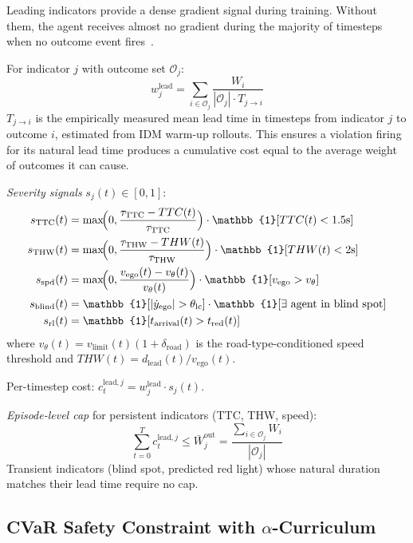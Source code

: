 \documentclass[conference]{IEEEtran}
\begin{document}
Leading indicators provide a dense gradient signal during training.
Without them, the agent receives almost no gradient during the majority
of timesteps when no outcome event fires~\cite{LSTC2024}.

For indicator $j$ with outcome set $\mathcal{O}_{j}$:
\begin{equation}
w_{j}^{\text{lead}}=\sum_{i\in\mathcal{O}_{j}}
  \frac{W_{i}}{|\mathcal{O}_{j}|\cdot T_{j\to i}}
\label{eq:indweight}
\end{equation}
$T_{j\to i}$ is the empirically measured mean lead time in timesteps
from indicator $j$ to outcome $i$, estimated from IDM warm-up rollouts.
This ensures a violation firing for its natural lead time produces a
cumulative cost equal to the average weight of outcomes it can cause.

\textit{Severity signals} $s_{j}(t)\in[0,1]$:
\begin{align}
s_{\text{TTC}}(t)&=\max\!\Bigl(0,\frac{\tau_{\text{TTC}}-TTC(t)}
  {\tau_{\text{TTC}}}\Bigr)\cdot\mathbb{1}[TTC(t)<1.5\text{s}]\\
s_{\text{THW}}(t)&=\max\!\Bigl(0,\frac{\tau_{\text{THW}}-THW(t)}
  {\tau_{\text{THW}}}\Bigr)\cdot\mathbb{1}[THW(t)<2\text{s}]\\
s_{\text{spd}}(t)&=\max\!\Bigl(0,\frac{v_{\text{ego}}(t)-v_{\theta}(t)}
  {v_{\theta}(t)}\Bigr)\cdot\mathbb{1}[v_{\text{ego}}>v_{\theta}]\\
s_{\text{blind}}(t)&=\mathbb{1}[|\dot{y}_{\text{ego}}|>\theta_{\text{lc}}]
  \cdot\mathbb{1}[\exists\text{ agent in blind spot}]\\
s_{\text{rl}}(t)&=\mathbb{1}[t_{\text{arrival}}(t)>t_{\text{red}}(t)]
\end{align}
where $v_{\theta}(t)=v_{\text{limit}}(t)(1+\delta_{\text{road}})$ is the
road-type-conditioned speed threshold and
$THW(t)=d_{\text{lead}}(t)/v_{\text{ego}}(t)$.

Per-timestep cost: $c_{t}^{\text{lead},j}=w_{j}^{\text{lead}}\cdot s_{j}(t)$.

\textit{Episode-level cap} for persistent indicators
(TTC, THW, speed):
\begin{equation}
\sum_{t=0}^{T}c_{t}^{\text{lead},j}\leq
  \bar{W}_{j}^{\text{out}}=
  \frac{\sum_{i\in\mathcal{O}_{j}}W_{i}}{|\mathcal{O}_{j}|}
\label{eq:cap}
\end{equation}
Transient indicators (blind spot, predicted red light) whose natural
duration matches their lead time require no cap.

\subsection{CVaR Safety Constraint with $\alpha$-Curriculum}
\label{sec:cvar}
\end{document}
